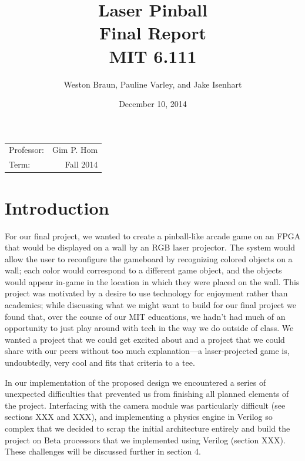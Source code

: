 \documentclass{article}
\title{\vspace{6cm}Laser Pinball \\ Final Report \\\vspace{1cm} MIT 6.111} %
\author{Weston Braun, Pauline Varley, and Jake Isenhart} %
\date{December 10, 2014} %
\begin{document}
\maketitle %
\vspace{8cm}
\begin{center}
\begin{tabular}{l r}
Professor: & Gim P. Hom \\
Term: & Fall 2014
\end{tabular}
\end{center}

\pagebreak


\section{Introduction} \label{intro}

For our final project, we wanted to create a pinball-like arcade game on an FPGA that would be displayed on a wall by an RGB laser projector. The system would allow the user to reconfigure the gameboard by recognizing colored objects on a wall; each color would correspond to a different game object, and the objects would appear in-game in the location in which they were placed on the wall. This project was motivated by a desire to use technology for enjoyment rather than academics; while discussing what we might want to build for our final project we found that, over the course of our MIT educations, we hadn't had much of an opportunity to just play around with tech in the way we do outside of class. We wanted a project that we could get excited about and a project that we could share with our peers without too much explanation—a laser-projected game is, undoubtedly, very cool and fits that criteria to a tee.

In our implementation of the proposed design we encountered a series of unexpected difficulties that prevented us from finishing all planned elements of the project. Interfacing with the camera module was particularly difficult (see sections XXX and XXX), and implementing a physics engine in Verilog so complex that we decided to scrap the initial architecture entirely and build the project on Beta processors that we implemented using Verilog (section XXX). These challenges will be discussed further in section 4.
\end{document}

